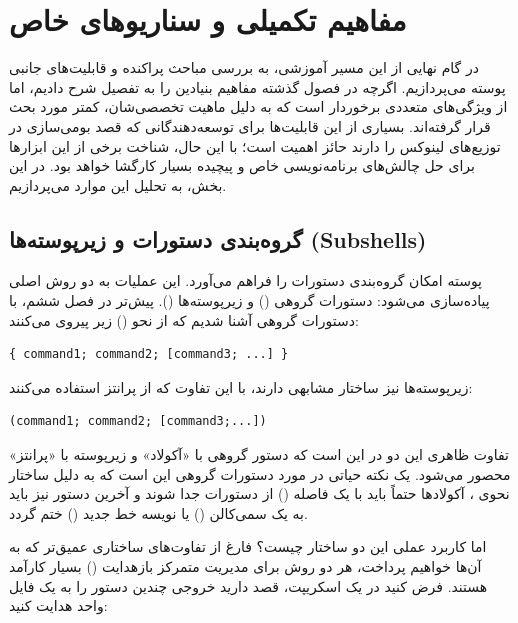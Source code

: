 \chapter{مفاهیم تکمیلی و سناریوهای خاص}

در گام نهایی از این مسیر آموزشی، به بررسی مباحث پراکنده و قابلیت‌های جانبی پوسته  می‌پردازیم. اگرچه در فصول گذشته مفاهیم بنیادین را به تفصیل شرح دادیم، اما  از ویژگی‌های متعددی برخوردار است که به دلیل ماهیت تخصصی‌شان، کمتر مورد بحث قرار گرفته‌اند. بسیاری از این قابلیت‌ها برای توسعه‌دهندگانی که قصد بومی‌سازی  در توزیع‌های لینوکس را دارند حائز اهمیت است؛ با این حال، شناخت برخی از این ابزارها برای حل چالش‌های برنامه‌نویسی خاص و پیچیده بسیار کارگشا خواهد بود. در این بخش، به تحلیل این موارد می‌پردازیم.

\section{گروه‌بندی دستورات و زیرپوسته‌ها (Subshells)}

پوسته  امکان گروه‌بندی دستورات را فراهم می‌آورد. این عملیات به دو روش اصلی پیاده‌سازی می‌شود: دستورات گروهی () و زیرپوسته‌ها (). پیش‌تر در فصل ششم، با دستورات گروهی آشنا شدیم که از نحو () زیر پیروی می‌کنند:

\begin{latin}
\begin{lstlisting}
{ command1; command2; [command3; ...] }
\end{lstlisting}
\end{latin}

زیرپوسته‌ها نیز ساختار مشابهی دارند، با این تفاوت که از پرانتز استفاده می‌کنند:

\begin{latin}
\begin{lstlisting}
(command1; command2; [command3;...])
\end{lstlisting}
\end{latin}

تفاوت ظاهری این دو در این است که دستور گروهی با «آکولاد» و زیرپوسته با «پرانتز» محصور می‌شود. یک نکته حیاتی در مورد دستورات گروهی این است که به دلیل ساختار نحوی ، آکولادها حتماً باید با یک فاصله () از دستورات جدا شوند و آخرین دستور نیز باید به یک سمی‌کالن (\cmd{;}) یا نویسه خط جدید () ختم گردد.

اما کاربرد عملی این دو ساختار چیست؟ فارغ از تفاوت‌های ساختاری عمیق‌تر که به آن‌ها خواهیم پرداخت، هر دو روش برای مدیریت متمرکز بازهدایت () بسیار کارآمد هستند. فرض کنید در یک اسکریپت، قصد دارید خروجی چندین دستور را به یک فایل واحد هدایت کنید:

